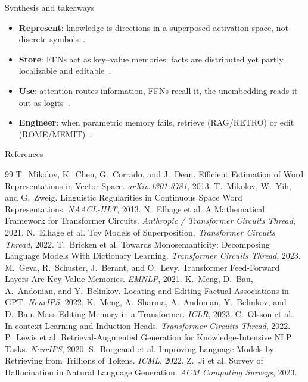 \documentclass[aspectratio=169,11pt]{beamer}
\begin{document}
\begin{frame}{Synthesis and takeaways}
  \begin{itemize}
    \item \textbf{Represent}: knowledge is directions in a superposed activation space,
      not discrete symbols~\cite{elhage2022superposition,bricken2023monosemanticity}.
    \item \textbf{Store}: FFNs act as key--value memories; facts are distributed yet
      partly localizable and editable~\cite{geva2021kvmemories,meng2022rome}.
    \item \textbf{Use}: attention routes information, FFNs recall it, the unembedding reads
      it out as logits~\cite{elhage2021mathematical,olsson2022incontext}.
    \item \textbf{Engineer}: when parametric memory fails, retrieve
      (RAG/RETRO) or edit (ROME/MEMIT)~\cite{lewis2020rag,borgeaud2022retro,meng2022memit}.
  \end{itemize}
\end{frame}

\begin{frame}[allowframebreaks]{References}
  \footnotesize
  \begin{thebibliography}{99}
     T.~Mikolov, K.~Chen, G.~Corrado, and J.~Dean.
      Efficient Estimation of Word Representations in Vector Space. \emph{arXiv:1301.3781}, 2013.
     T.~Mikolov, W.~Yih, and G.~Zweig.
      Linguistic Regularities in Continuous Space Word Representations. \emph{NAACL-HLT}, 2013.
     N.~Elhage et al.
      A Mathematical Framework for Transformer Circuits. \emph{Anthropic / Transformer Circuits Thread}, 2021.
     N.~Elhage et al.
      Toy Models of Superposition. \emph{Transformer Circuits Thread}, 2022.
     T.~Bricken et al.
      Towards Monosemanticity: Decomposing Language Models With Dictionary Learning. \emph{Transformer Circuits Thread}, 2023.
     M.~Geva, R.~Schuster, J.~Berant, and O.~Levy.
      Transformer Feed-Forward Layers Are Key-Value Memories. \emph{EMNLP}, 2021.
     K.~Meng, D.~Bau, A.~Andonian, and Y.~Belinkov.
      Locating and Editing Factual Associations in GPT. \emph{NeurIPS}, 2022.
     K.~Meng, A.~Sharma, A.~Andonian, Y.~Belinkov, and D.~Bau.
      Mass-Editing Memory in a Transformer. \emph{ICLR}, 2023.
     C.~Olsson et al.
      In-context Learning and Induction Heads. \emph{Transformer Circuits Thread}, 2022.
     P.~Lewis et al.
      Retrieval-Augmented Generation for Knowledge-Intensive NLP Tasks. \emph{NeurIPS}, 2020.
     S.~Borgeaud et al.
      Improving Language Models by Retrieving from Trillions of Tokens. \emph{ICML}, 2022.
     Z.~Ji et al.
      Survey of Hallucination in Natural Language Generation. \emph{ACM Computing Surveys}, 2023.
  \end{thebibliography}
\end{frame}
\end{document}
